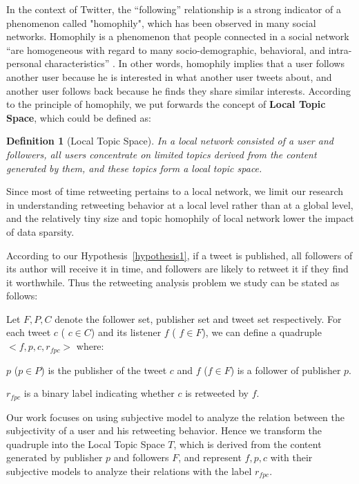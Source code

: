 \documentclass{acm_proc_article-sp}
\newtheorem{definition}{Definition}
\begin{document}
In the context of Twitter, the ``following'' relationship is a strong indicator of a phenomenon called "homophily", which has been observed in many social networks.
Homophily is a phenomenon that people connected in a social network ``are homogeneous with regard to many socio-demographic, behavioral, and intra-personal characteristics'' \cite{mcpherson2001birds}.
In other words, homophily implies that a user follows another user because he is interested in what another user tweets about, and another user follows back because he finds they share similar interests. 
According to the principle of homophily, we put forwards the concept of \textbf{Local Topic Space}, which could be defined as:
\begin{definition}[Local Topic Space]
\label{local}
In a local network consisted of a user and followers, all users concentrate on limited topics derived from the content generated by them, and these topics form a local topic space.
\end{definition}
Since most of time retweeting pertains to a local network, we limit our research in understanding retweeting behavior at a local level rather than at a global level, and the relatively tiny size and topic homophily of local network lower the impact of data sparsity.

According to our Hypothesis~\ref{hypothesis1}, if a tweet is published, all followers of its author will receive it in time, and followers are likely to retweet it if they find it worthwhile. 
Thus the retweeting analysis problem we study can be stated as follows:

Let $ F, P, C $ denote the follower set, publisher set and tweet set respectively. 
For each tweet $c$ ( $ c \in C $) and its listener $ f $ ( $ f \in F $), we can define a quadruple $ <f, p, c, r_{fpc}>  $ where: 
\begin{itemize*}
\item  $p$ ($p \in P $) is the publisher of the tweet $c$ and $f$ ($ f \in F $) is a follower of publisher $p$.
\item $ r_{fpc} $ is a binary label indicating whether $ c $ is retweeted by $ f $.
\item Our work focuses on using subjective model to analyze the relation between the subjectivity of a user and his retweeting behavior. 
Hence we transform the quadruple into the Local Topic Space $ T $, which is derived from the content generated by publisher $ p $ and followers $F $, and represent $ f, p, c $ with their subjective models to analyze their relations with the label $ r_{fpc} $.
\end{itemize*}
\end{document}
